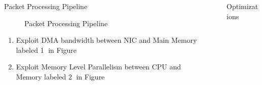 \documentclass[final]{beamer}
\newlength{\sepwid}
\newlength{\onecolwid}
\newlength{\twocolwid}
\begin{document}
\begin{frame}
\begin{columns}[t]
\begin{column}{\onecolwid}
\begin{exampleblock}{Packet Processing Pipeline}
\begin{figure}
\caption{Packet Processing Pipeline}
\end{figure}
\begin{enumerate}[*]
 \item Exploit DMA bandwidth between NIC and Main Memory labeled \textcircled{1} in Figure
 \item Exploit Memory Level Parallelism between CPU and Memory labeled \textcircled{2} in Figure
\end{enumerate}
\end{exampleblock}




\end{column} %

\begin{column}{\sepwid}\end{column} %

\begin{column}{\twocolwid} %




\begin{exampleblock}{Optimizations}
\begin{multicols}{3}


\end{multicols}
\end{exampleblock}
\end{column}
\end{columns}
\end{frame}
\end{document}
